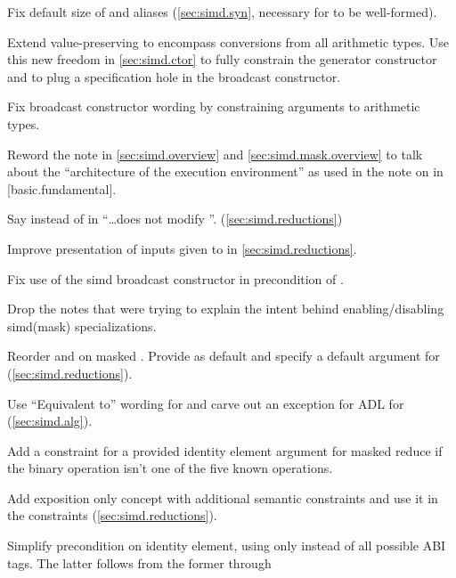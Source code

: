 \begin{revision}
\item Fix default size of  and  aliases
  (\ref{sec:simd.syn}, necessary for
  \std{} to be well-formed).
\item Extend value-preserving to encompass conversions from all arithmetic
  types. Use this new freedom in \ref{sec:simd.ctor} to fully constrain the
  generator constructor and to plug a specification hole in the broadcast
  constructor.
\item Fix broadcast constructor wording by constraining \constexprwrapperlike
  arguments to arithmetic types.
\item Reword the note in \ref{sec:simd.overview} and
  \ref{sec:simd.mask.overview} to talk about the “architecture of the execution
  environment” as used in the note on  in [basic.fundamental].
\item Say  instead of  in “\ldots does
  not modify ”. (\ref{sec:simd.reductions})
\item Improve presentation of inputs given to
   in \ref{sec:simd.reductions}.
\item Fix use of the simd broadcast constructor in precondition of
  .
\item Drop the notes that were trying to explain the intent behind
  enabling/disabling simd(mask) specializations.
\item Reorder  and  on masked
  . Provide  as default 
  and specify a default argument for 
  (\ref{sec:simd.reductions}).
\item Use “Equivalent to” wording for  and carve out an
  exception for ADL for \simdselect (\ref{sec:simd.alg}).
\item Add a constraint for a provided identity element argument for masked
  reduce if the binary operation isn't one of the five known operations.
\item Add exposition only concept \reductionoperation with additional semantic
  constraints and use it in the  constraints
  (\ref{sec:simd.reductions}).
\item Simplify precondition on identity element, using only 
  instead of all possible ABI tags. The latter follows from the former through

\end{revision}
